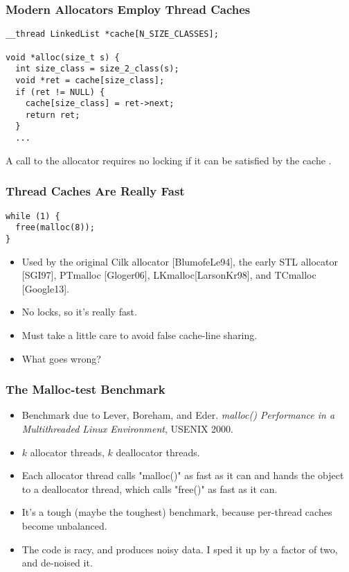 \documentclass[xcolor=dvipsnames,14pt]{beamer}
\begin{document}
\begin{frame}[fragile]
\frametitle{Modern Allocators Employ Thread Caches}

\begin{verbatim}
__thread LinkedList *cache[N_SIZE_CLASSES];

void *alloc(size_t s) {
  int size_class = size_2_class(s);
  void *ret = cache[size_class];
  if (ret != NULL) {
    cache[size_class] = ret->next;
    return ret;
  }
  ...
\end{verbatim}

A call to the allocator requires no locking if it can be satisfied by the cache .
\end{frame}

\begin{frame}[fragile]
\frametitle{Thread Caches Are Really Fast}

\begin{verbatim}
while (1) {
  free(malloc(8));
}
\end{verbatim}

\begin{itemize}
\item Used by the original Cilk allocator [BlumofeLe94], the early STL allocator [SGI97], PTmalloc [Gloger06], LKmalloc[LarsonKr98], and TCmalloc [Google13].
\item No locks, so it's really fast.
\item Must take a little care to avoid false cache-line sharing.
\item What goes wrong?
\end{itemize}
\end{frame}

\begin{frame}[fragile]
\frametitle{The Malloc-test Benchmark}

\begin{itemize}
\item Benchmark due to Lever, Boreham, and Eder.
\textit{malloc() Performance in a Multithreaded Linux
  Environment}, USENIX 2000.

\item $k$ allocator threads, $k$ deallocator threads.

\item Each allocator thread calls "malloc()" as fast as it can and hands the object to a deallocator thread, which calls "free()" as fast as it can.

\item It's a tough (maybe the toughest) benchmark, because per-thread caches become unbalanced.

\item The code is racy, and produces noisy data.  I sped it up by a factor of two, and de-noised it.
\end{itemize}

\end{frame}
\end{document}
